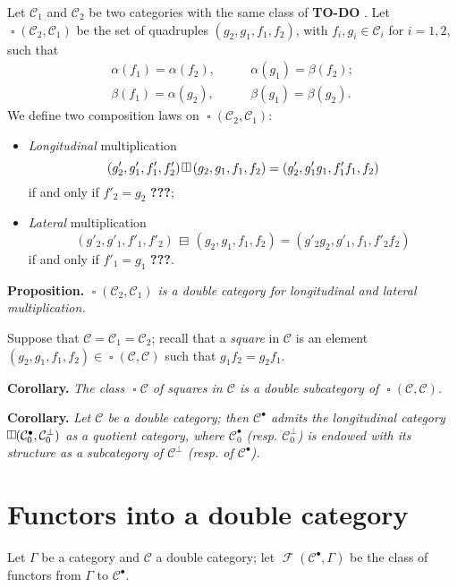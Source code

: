 \documentclass{article}
\newenvironment{itenv}[1]
  {\phantomsection\par\medskip\noindent\textbf{#1.}\itshape}
  {\par\medskip}
\newcommand{\todo}{{\color{purple}\textbf{TO-DO }}}
\newcommand{\unsure}[1]{{\color{purple}\textbf{#1}}}
\newcommand{\CC}{\mathcal{C}}
\newcommand{\dotc}{{\mathbin{\bullet}}}
\newcommand{\botc}{{\mathbin{\bot}}}
\DeclareMathOperator{\sq}{\square}
\DeclareMathOperator{\vsq}{{\rotatebox{90}{$\boxminus$}}}
\newcommand{\vmult}{{\,\rotatebox{90}{$\boxminus$}\,}}
\newcommand{\hmult}{{\,\boxminus\,}}
\DeclareMathOperator{\FF}{\mathcal{F}}
\begin{document}
Let $\CC_1$ and $\CC_2$ be two categories with the same class of \todo.
Let $\sq(\CC_2,\CC_1)$ be the set of quadruples $(g_2,g_1,f_1,f_2)$, with $f_i,g_i\in\CC_i$ for $i=1,2$, such that
\[
  \begin{aligned}
    \alpha(f_1)
    = \alpha(f_2),
    &\qquad
    \alpha(g_1)
    = \beta(f_2);
  \\\beta(f_1)
    = \alpha(g_2),
    &\qquad
    \beta(g_1)
    = \beta(g_2).
  \end{aligned}
\]
We define two composition laws on $\sq(\CC_2,\CC_1)$:
\begin{itemize}
  \item \emph{Longitudinal} multiplication
    \[
      (g'_2,g'_1,f'_1,f'_2)\vmult(g_2,g_1,f_1,f_2)
      = (g'_2,g'_1g_1,f'_1f_1,f_2)
    \]
    if and only if $f'_2=g_2$ \unsure{???};
  \item \emph{Lateral} multiplication
    \[
      (g'_2,g'_1,f'_1,f'_2)\hmult(g_2,g_1,f_1,f_2)
      = (g'_2g_2,g'_1,f_1,f'_2f_2)
    \]
    if and only if $f'_1=g_1$ \unsure{???}.
\end{itemize}

\begin{itenv}{Proposition}
  $\sq(\CC_2,\CC_1)$ is a double category for longitudinal and lateral multiplication.
\end{itenv}

Suppose that $\CC=\CC_1=\CC_2$;
recall that a \emph{square} in $\CC$ is an element $(g_2,g_1,f_1,f_2)\in\sq(\CC,\CC)$ such that $g_1f_2=g_2f_1$.

\begin{itenv}{Corollary}
  The class $\sq\CC$ of squares in $\CC$ is a double subcategory of $\sq(\CC,\CC)$.
\end{itenv}

\begin{itenv}{Corollary}
  Let $\CC$ be a double category;
  then $\CC^\dotc$ admits the longitudinal category $\vsq(\CC_0^\dotc,\CC_0^\botc)$ as a quotient category, where $\CC_0^\dotc$ (resp. $\CC_0^\botc$) is endowed with its structure as a subcategory of $\CC^\botc$ (resp. of $\CC^\dotc$).
\end{itenv}


\section{Functors into a double category}

Let $\Gamma$ be a category and $\CC$ a double category;
let $\FF(\CC^\dotc,\Gamma)$ be the class of functors from $\Gamma$ to $\CC^\dotc$.
\end{document}
